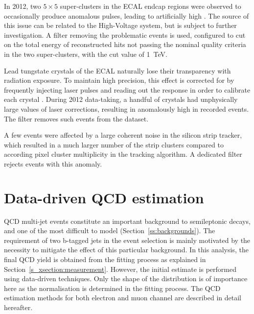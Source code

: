 \begin{description}[wide=\parindent]
	\item[Bad ECAL endcap super-cluster filter.] In 2012, two $5\times5$ super-clusters in the ECAL endcap regions were
	observed to occasionally produce anomalous pulses, leading to artificially high \MET. The source of this issue can
	be related to the High-Voltage system, but is subject to further investigation. A filter removing the problematic
	events is used, configured to cut on the total energy of reconstructed hits not passing the nominal quality criteria
	in the two super-clusters, with the cut value of \SI{1}{\TeV}.

	\item[ECAL laser correction filter.] Lead tungstate crystals of the ECAL naturally lose their transparency with
	radiation exposure. To maintain high precision, this effect is corrected for by frequently injecting laser pulses
	and reading out the response in order to calibrate each crystal \autocite{CMS_TDR1}. During 2012 data-taking, a
	handful of crystals had unphysically large values of laser corrections, resulting in anomalously high \MET in
	recorded events. The filter removes such events from the dataset.

	\item[Strip tracker noise filter.] A few events were affected by a large coherent noise in the silicon strip
	tracker, which resulted in a much larger number of the strip clusters compared to according pixel cluster
	multiplicity in the tracking algorithm. A dedicated filter rejects events with this anomaly.

\end{description}


\section{Data-driven QCD estimation}
\label{s_xsection:data_driven_QCD}
QCD multi-jet events constitute an important background to semileptonic \ttbar decays, and one of the most difficult to
model (Section~\ref{ss:backgrounds}). The requirement of two b-tagged jets in the event selection is mainly motivated by
the necessity to mitigate the effect of this particular background. In this analysis, the final QCD yield is obtained
from the fitting process as explained in Section~\ref{s_xsection:measurement}. However, the initial estimate is
performed using data-driven techniques. Only the shape of the distribution is of importance here as the normalisation is
determined in the fitting process. The QCD estimation methods for both electron and muon channel are described in detail
hereafter.

